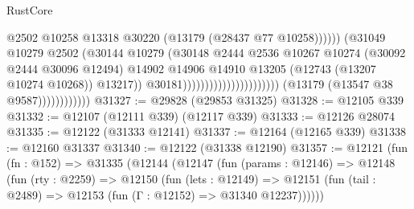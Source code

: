 \begin{lexlean}{RustCore}
\begin{coremodule}
                                                                          @2502
                                                                          @10258
                                                                          @13318
                                                                          @30220
                                                                          (@13179
                                                                            (@28437 @77 @10258))))))
                                                                  (@31049
                                                                    @10279
                                                                    @2502
                                                                    (@30144
                                                                      @10279
                                                                      (@30148
                                                                        @2444
                                                                        @2536
                                                                        @10267
                                                                        @10274
                                                                        (@30092 @2444 @30096 @12494)
                                                                        @14902
                                                                        @14906
                                                                        @14910
                                                                        @13205
                                                                        (@12743
                                                                          (@13207 @10274 @10268))
                                                                        @13217))
                                                                    @30181))))))))))))))))))))))
                        (@13179 (@13547 @38 @9587))))))))))))
@31327 := @29828 (@29853 @31325)
@31328 := @12105 @339
@31332 := @12107 (@12111 @339) (@12117 @339)
@31333 := @12126 @28074
@31335 := @12122 (@31333 @12141)
@31337 := @12164 (@12165 @339)
@31338 := @12160 @31337
@31340 := @12122 (@31338 @12190)
@31357 := @12121
    (fun (fn : @152) =>
    @31335
      (@12144
        (@12147
          (fun (params : @12146) =>
          @12148
            (fun (rty : @2259) =>
            @12150
              (fun (lets : @12149) =>
              @12151 (fun (tail : @2489) => @12153 (fun (Γ : @12152) => @31340 @12237))))))

\end{coremodule}
\end{lexlean}
